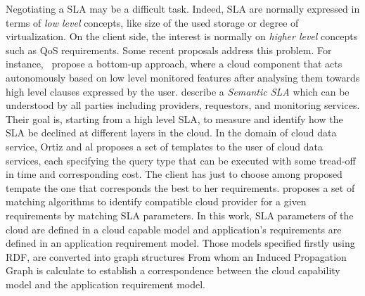


Negotiating a SLA may be a difficult task.
Indeed, SLA are normally expressed in terms of \textit{low level} concepts, like size of the used storage or degree of virtualization. 
On the client side, the interest is normally on \textit{higher level} concepts such as QoS requirements.
Some recent proposals address this problem.  
For instance,~\cite{5547150} propose a bottom-up approach, where a cloud component that acts autonomously based on low level monitored features after analysing them towards high level clauses expressed by the user. 
  \cite{Dastjerdi:2012:DOA:2275356.2275360} describe a \textit{Semantic SLA} which can be understood by all parties including providers, requestors, and monitoring services.
Their goal is, starting from a high level SLA, to measure and identify how the SLA be declined at different layers in the cloud. In the domain of cloud data service, Ortiz and al  \cite{Ortiz:2013:VPS:2486767.2486772}
  proposes a set of templates to the user of cloud data services, each specifying the query type that can be executed with some tread-off in time and corresponding cost.  The client has just to choose among proposed tempate the one that corresponds the best to her requirements. \cite{6141307} proposes a set of matching algorithms to identify compatible cloud provider for a given requirements by matching SLA parameters. In this work, SLA parameters of the cloud are defined in a cloud capable model and application's requirements are defined in an application requirement model. Those models specified firstly using RDF, are converted into graph structures  
From whom an Induced Propagation Graph is calculate to establish a correspondence between the cloud capability model and the application requirement model.


